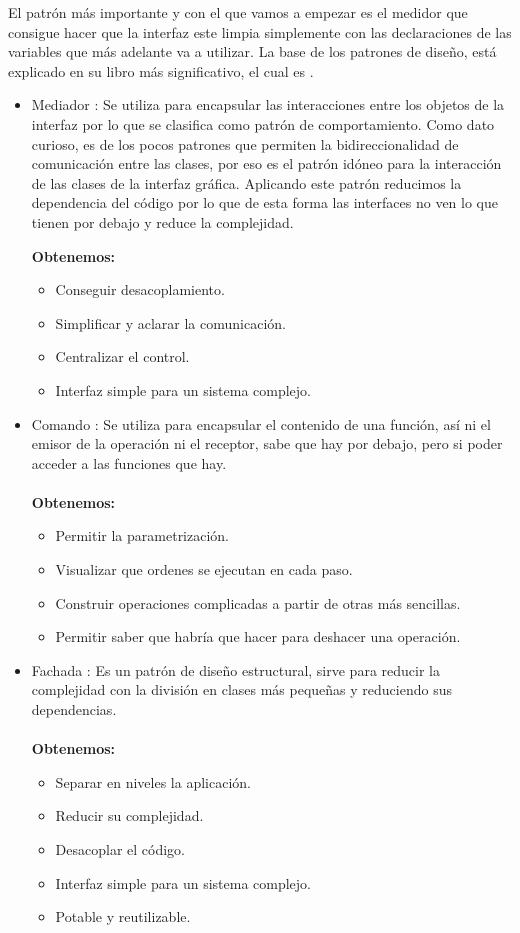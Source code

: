 El patrón más importante y con el que vamos a empezar es el medidor que consigue hacer que la interfaz este limpia simplemente con las declaraciones de las variables que más adelante va a utilizar.
La base de los patrones de diseño, está explicado en su libro más significativo, el cual es \cite{Hunt2013}.

\begin{itemize}
\item Mediador \cite{wiki:Mediador}: Se utiliza para encapsular las interacciones entre los objetos de la interfaz por lo que se clasifica como patrón de comportamiento.
Como dato curioso, es de los pocos patrones que permiten la bidireccionalidad de comunicación entre las clases, por eso es el patrón idóneo para la interacción de las clases de la interfaz gráfica.
Aplicando este patrón reducimos la dependencia del código por lo que de esta forma las interfaces no ven lo que tienen por debajo y reduce la complejidad.

\textbf{Obtenemos:}
\begin{itemize}
\item Conseguir desacoplamiento.
\item Simplificar y aclarar la comunicación.
\item Centralizar el control.
\item Interfaz simple para un sistema complejo.
\end{itemize}

\item Comando \cite{wiki:Comando}: Se utiliza para encapsular el contenido de una función, así ni el emisor de la operación ni el receptor, sabe que hay por debajo, pero si poder acceder a las funciones que hay.\\\\
\textbf{Obtenemos:}
\begin{itemize}
\item Permitir la parametrización.
\item Visualizar que ordenes se ejecutan en cada paso.
\item Construir operaciones complicadas a partir de otras más sencillas.
\item Permitir saber que habría que hacer para deshacer una operación.
\end{itemize}
\item Fachada \cite{wiki:Fachada}: Es un patrón de diseño estructural, sirve para reducir la complejidad con la división en clases más pequeñas y reduciendo sus dependencias.\\\\
\textbf{Obtenemos:}
\begin{itemize}
\item Separar en niveles la aplicación.
\item Reducir su complejidad.
\item Desacoplar el código.
\item Interfaz simple para un sistema complejo.
\item Potable y reutilizable.
\end{itemize}
\end{itemize}
